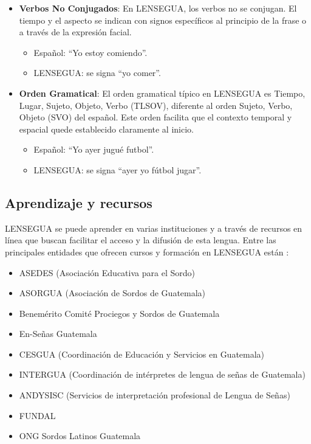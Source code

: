 \begin{itemize}
    \item \textbf{Verbos No Conjugados}: En LENSEGUA, los verbos no se conjugan. El tiempo y el aspecto se indican con signos específicos al principio de la frase o a través de la expresión facial.
    \begin{itemize}
        \item Español: ``Yo estoy comiendo''.
        \item LENSEGUA: se signa ``yo comer''.
    \end{itemize}
    
    \item \textbf{Orden Gramatical}: El orden gramatical típico en LENSEGUA es Tiempo, Lugar, Sujeto, Objeto, Verbo (TLSOV), diferente al orden Sujeto, Verbo, Objeto (SVO) del español. Este orden facilita que el contexto temporal y espacial quede establecido claramente al inicio.
    \begin{itemize}
        \item Español: ``Yo ayer jugué futbol''.
        \item LENSEGUA: se signa ``ayer yo fútbol jugar''.
    \end{itemize}
\end{itemize}

\subsection{Aprendizaje y recursos}

LENSEGUA se puede aprender en varias instituciones y a través de recursos en línea que buscan facilitar el acceso y la difusión de esta lengua. Entre las principales entidades que ofrecen cursos y formación en LENSEGUA están \cite{LenseguaSF}:

\begin{itemize}
    \item ASEDES (Asociación Educativa para el Sordo)
    \item ASORGUA (Asociación de Sordos de Guatemala)
    \item Benemérito Comité Prociegos y Sordos de Guatemala
    \item En-Señas Guatemala
    \item CESGUA (Coordinación de Educación y Servicios en Guatemala)
    \item INTERGUA (Coordinación de intérpretes de lengua de señas de Guatemala)
    \item ANDYSISC (Servicios de interpretación profesional de Lengua de Señas)
    \item FUNDAL
    \item ONG Sordos Latinos Guatemala
\end{itemize}

